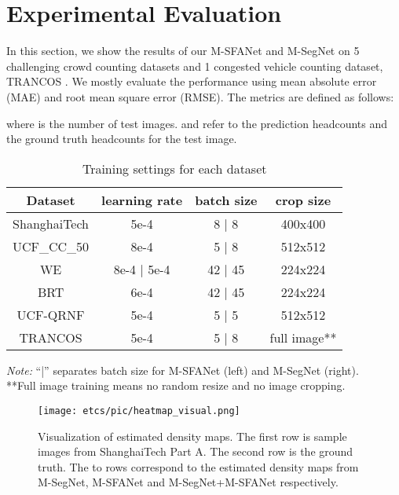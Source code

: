 \documentclass[10pt, conference, a4paper]{IEEEtran}
\begin{document}
\section{Experimental Evaluation}
In this section, we show the results of our M-SFANet and M-SegNet on 5 challenging crowd counting datasets and 1 congested vehicle counting dataset, TRANCOS \cite{guerrero2015extremely}. We mostly evaluate the performance using mean absolute error (MAE) and root mean square error (RMSE). The metrics are defined as follows:

where  is the number of test images.  and  refer to the prediction headcounts and the ground truth headcounts for the  test image.

\setlength{\tabcolsep}{2pt}
\begin{table}
\begin{center}
\caption{Training settings for each dataset}
\begin{tabular}{c|c|c|c}
\hline
\textbf{Dataset}
 & learning rate & batch size & crop size\\
\hline
ShanghaiTech \cite{zhang2016single} & 5e-4 & 8 | 8 & 400x400\\
UCF\_CC\_50 \cite{bansal2015people} & 8e-4 & 5 | 8 & 512x512\\
WE \cite{zhang2015cross} & 8e-4 | 5e-4 & 42 | 45 & 224x224\\
BRT \cite{ding2018deeply} & 6e-4 & 42 | 45 & 224x224\\
UCF-QRNF \cite{idrees2018composition} & 5e-4 & 5 | 5 & 512x512\\
TRANCOS \cite{guerrero2015extremely} & 5e-4 & 5 | 8 & full image**\\
\hline
\end{tabular}
\label{table:lr_bs_table}
\end{center}
\footnotesize\emph{Note:} ``|'' separates batch size for M-SFANet (left) and M-SegNet (right).\\
**Full image training means no random resize and no image cropping.
\end{table}
%
 
\begin{figure}
    \centering
    \texttt{[image: etcs/pic/heatmap\_visual.png]}
    \caption{Visualization of estimated density maps. The first row is sample images from ShanghaiTech Part A. The second row is the ground truth. The  to  rows correspond to the estimated density maps from M-SegNet, M-SFANet and M-SegNet+M-SFANet respectively.}
    \label{fig:heatmap_visual_sha}
\end{figure}
\end{document}
